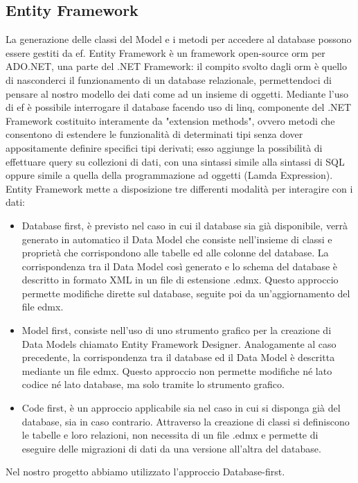 
\subsection{Entity Framework}

La generazione delle classi del Model e i metodi per accedere al database possono essere gestiti da \Gls{ef}.
Entity Framework è un framework open-source \Gls{orm} per ADO.NET, una parte del .NET Framework: il compito svolto dagli \Gls{orm} è quello di nasconderci il funzionamento di un database relazionale, permettendoci di pensare al nostro modello dei dati come ad un insieme di oggetti.
Mediante l'uso di \Gls{ef} è possibile interrogare il database facendo uso di \Gls{linq}, componente del .NET Framework costituito interamente da "extension methods", ovvero metodi che consentono di estendere le funzionalità di determinati tipi senza dover appositamente definire specifici tipi derivati; esso aggiunge la possibilità di effettuare query su collezioni di dati, con una sintassi simile alla sintassi di SQL oppure simile a quella della programmazione ad oggetti (Lamda Expression).
Entity Framework mette a disposizione tre differenti modalità per interagire con i dati:
\begin{itemize}
    \item Database first, è previsto nel caso in cui il database sia già disponibile, verrà generato in automatico il Data Model che consiste nell'insieme di classi e proprietà che corrispondono alle tabelle ed alle colonne del database. La corrispondenza tra il Data Model così generato e lo schema del database è descritto in formato XML in un file di estensione .edmx. Questo approccio permette modifiche dirette sul database, seguite poi da un'aggiornamento del file edmx.
    \item Model first, consiste nell'uso di uno strumento grafico per la creazione di Data Models chiamato Entity Framework Designer. Analogamente al caso precedente, la corrispondenza tra il database ed il Data Model è descritta mediante un file edmx. Questo approccio non permette modifiche né lato codice né lato database, ma solo tramite lo strumento grafico.
    \item Code first, è un approccio applicabile sia nel caso in cui si disponga già del database, sia in caso contrario. Attraverso la creazione di classi si definiscono le tabelle e loro relazioni, non necessita di un file .edmx e permette di eseguire delle migrazioni di dati da una versione all'altra del database.
\end{itemize}
Nel nostro progetto abbiamo utilizzato l'approccio Database-first.

